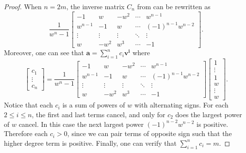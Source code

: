 \documentclass [12pt,a4paper,reqno]{amsart}
\theoremstyle{plain}
\theoremstyle{definition}
\newtheorem{Assumptions and Discussion}[Theorem]{Assumptions and Discussion}
\theoremstyle{remark}
\begin{document}
\begin{proof}
When $n=2m$, the inverse matrix $C_n$ from  can be rewritten as
\[
        \frac{1}{w^n-1}\begin{bmatrix}
             -1 & w & -w^2 & \cdots & w^{n-1}\\
            w^{n-1} & -1 & w & \cdots & (-1)^{n-1}w^{n-2}\\
            \vdots & \vdots & \vdots & \ddots & \vdots\\
            w & -w^2 & w^3 & \cdots & -1
        \end{bmatrix}.
    \]
    Moreover, one can see that $\mathbf{a}=\sum _{i=1}^n c_i\mathbf{v^i}$ where 
    \begin{equation}\label{evenCycle}
     \begin{bmatrix}
             c_1 \\
            \vdots\\
            c_n
        \end{bmatrix}=\frac{1}{w^n-1}\begin{bmatrix}
             -1 & w & -w^2 & \cdots & w^{n-1}\\
            w^{n-1} & -1 & w & \cdots & (-1)^{n-1}w^{n-2}\\
            \vdots & \vdots & \vdots & \ddots & \vdots\\
            w & -w^2 & w^3 & \cdots & -1
        \end{bmatrix}\begin{bmatrix}
             1 \\
             \vdots\\
            1\\
            w\\
            \vdots\\
            w 
        \end{bmatrix}.
    \end{equation}
    Notice that each $c_i$ is a sum of powers of $w$ with alternating signs. For each $2\leq i\leq n$, the first and last terms cancel, and only for $c_2$ does the largest power of $w$ cancel. In this case the next largest power $(-1)^{n-2}w^{n-2}$ is positive. Therefore each $c_i>0$, since we can pair  terms of opposite sign such that the higher degree term is positive. Finally, one can verify that $\sum_{i=1}^n c_i = m$.


\end{proof}
\end{document}
